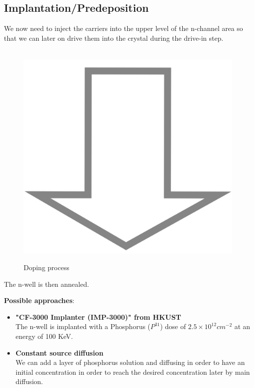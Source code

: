 \newpage

\subsection{Implantation/Predeposition}\label{nwell_implant_step}
We now need to inject the carriers into the upper level of the n-channel area so that we can later on drive them into the crystal during the drive-in step.

\begin{figure}[H]
	\centering
	\begin{tikzpicture}[node distance = 3cm, auto, thick,scale=\CrossSectionOnly, every node/.style={transform shape}]
		
	\end{tikzpicture} \\
	\includegraphics[scale=0.01]{down_arrow.png} \\
	\begin{tikzpicture}[node distance = 3cm, auto, thick,scale=\CrossSectionOnly, every node/.style={transform shape}]
		
	\end{tikzpicture}
	\caption{Doping process}
\end{figure}

The n-well is then annealed.

\textbf{Possible approaches}:
\begin{itemize}
	\item \textbf{"CF-3000 Implanter (IMP-3000)" from HKUST} \\
	The n-well is implanted with a Phosphorus ($P^{31}$) dose of $2.5\times10^{12}cm^{-2}$ at an energy of 100 KeV.
	\item \textbf{Constant source diffusion} \\
	We can add a layer of phosphorus solution and diffusing in order to have an initial concentration in order to reach the desired concentration later by main diffusion.
\end{itemize}

